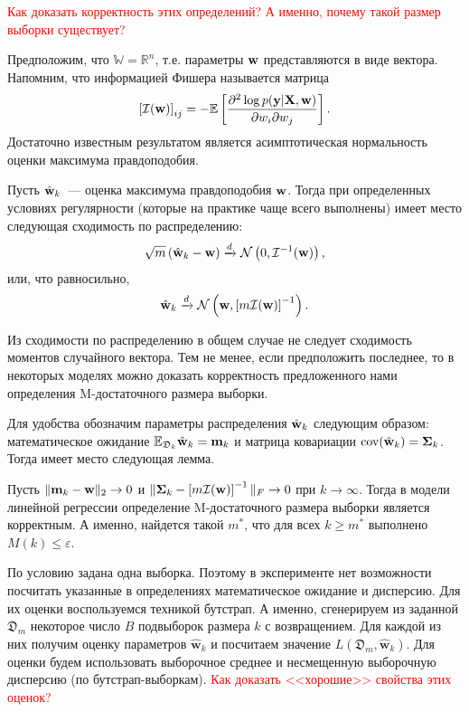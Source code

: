 \textcolor{red}{Как доказать корректность этих определений? А именно, почему такой размер выборки существует?}

Предположим, что $\mathbb{W} = \mathbb{R}^n$, т.е. параметры $\mathbf{w}$ представляются в виде вектора. Напомним, что информацией Фишера называется матрица
\[ \left[\mathcal{I}(\mathbf{w})\right]_{ij} = - \mathbb{E}\left[ \dfrac{\partial^2 \log p(\mathbf{y} | \mathbf{X}, \mathbf{w})}{\partial w_i \partial w_j} \right]. \]
Достаточно известным результатом является асимптотическая нормальность оценки максимума правдоподобия. 

\begin{proposition}
    Пусть $\hat{\mathbf{w}}_k$~--- оценка максимума правдоподобия $\mathbf{w}$. Тогда при определенных условиях регулярности (которые на практике чаще всего выполнены) имеет место следующая сходимость по распределению:
    \[ \sqrt{m}\left( \hat{\mathbf{w}}_k - \mathbf{w} \right) \xrightarrow{d} \mathcal{N}\left(0, \mathcal{I}^{-1}(\mathbf{w})\right), \]
    или, что равносильно,
    \[ \hat{\mathbf{w}}_k \xrightarrow{d} \mathcal{N}\left(\mathbf{w}, \left[m\mathcal{I}(\mathbf{w})\right]^{-1}\right). \]
\end{proposition}

Из сходимости по распределению в общем случае не следует сходимость моментов случайного вектора. Тем не менее, если предположить последнее, то в некоторых моделях можно доказать корректность предложенного нами определения M-достаточного размера выборки.

Для удобства обозначим параметры распределения $\hat{\mathbf{w}}_k$ следующим образом: математическое ожидание $\mathbb{E}_{\mathfrak{D}_k}\hat{\mathbf{w}}_k = \mathbf{m}_k$ и матрица ковариации $\text{cov}(\hat{\mathbf{w}}_k) = \boldsymbol{\Sigma}_k$. Тогда имеет место следующая лемма.

\begin{lemma}\label{lemma1}
    Пусть $\| \mathbf{m}_k - \mathbf{w} \|_2 \to 0$ и $\| \boldsymbol{\Sigma}_k - \left[m\mathcal{I}(\mathbf{w})\right]^{-1} \|_{F} \to 0$ при $k \to \infty$. Тогда в модели линейной регрессии определение M-достаточного размера выборки является корректным. А именно, найдется такой $m^*$, что для всех $k \geqslant m^*$ выполнено $M(k) \leqslant \varepsilon$.
\end{lemma}

По условию задана одна выборка. Поэтому в эксперименте нет возможности посчитать указанные в определениях математическое ожидание и дисперсию. Для их оценки воспользуемся техникой бутстрап. А именно, сгенерируем из заданной $\mathfrak{D}_m$ некоторое число $B$ подвыборок размера $k$ с возвращением. Для каждой из них получим оценку параметров $\hat{\mathbf{w}}_{k}$ и посчитаем значение $L(\mathfrak{D}_m, \hat{\mathbf{w}}_{k})$. Для оценки будем использовать выборочное среднее и несмещенную выборочную дисперсию (по бутстрап-выборкам). \textcolor{red}{Как доказать <<хорошие>> свойства этих оценок?}